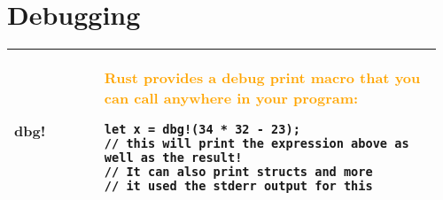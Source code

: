 \documentclass[main.tex,fontsize=8pt,paper=a4,paper=portrait,DIV=calc,]{scrartcl}
\begin{document}
\pagebreak
\begin{table}[ht!]
\section{Debugging}
\begin{tabular}{|m{0.2\linewidth}|m{0.755\linewidth}|}
\hline
dbg! &
\textcolor{orange}{Rust provides a debug print macro that you can call anywhere in your program:}\newline
\begin{lstlisting}
let x = dbg!(34 * 32 - 23); 
// this will print the expression above as well as the result!
// It can also print structs and more
// it used the stderr output for this
\end{lstlisting}\\
\hline

\hline

\hline

\hline
\end{tabular}
\end{table}
\pagebreak 
\begin{table}[ht!]
\begin{tabular}{|m{0.2\linewidth}|m{0.755\linewidth}|}
\hline

\hline

\hline

\hline

\hline

\hline

\hline

\hline

\hline

\hline
\end{tabular}
\end{table}
\end{document}
